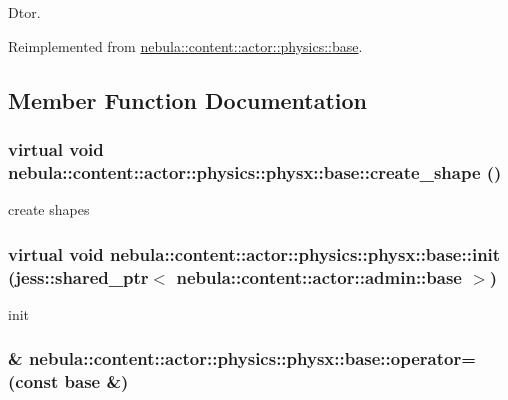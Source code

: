 Dtor. 

Reimplemented from \hyperlink{classnebula_1_1content_1_1actor_1_1physics_1_1base_ac61d7fb5a9b39875b73a4709d20df23e}{nebula::content::actor::physics::base}.

\subsection{Member Function Documentation}
\hypertarget{classnebula_1_1content_1_1actor_1_1physics_1_1physx_1_1base_a1468fd6d256631892912ecec7f236c01}{
\subsubsection[{create\_\-shape}]{\setlength{\rightskip}{0pt plus 5cm}virtual void nebula::content::actor::physics::physx::base::create\_\-shape ()}}
\label{classnebula_1_1content_1_1actor_1_1physics_1_1physx_1_1base_a1468fd6d256631892912ecec7f236c01}


create shapes \hypertarget{classnebula_1_1content_1_1actor_1_1physics_1_1physx_1_1base_a44f695bfb034dae049191b2668a97c70}{
\subsubsection[{init}]{\setlength{\rightskip}{0pt plus 5cm}virtual void nebula::content::actor::physics::physx::base::init (jess::shared\_\-ptr$<$ {\bf nebula::content::actor::admin::base} $>$)}}
\label{classnebula_1_1content_1_1actor_1_1physics_1_1physx_1_1base_a44f695bfb034dae049191b2668a97c70}


init \hypertarget{classnebula_1_1content_1_1actor_1_1physics_1_1physx_1_1base_a0e06604de753b8803bf4364ab967d23d}{
\subsubsection[{operator=}]{\& nebula::content::actor::physics::physx::base::operator= (const {\bf base} \&)}}
\label{classnebula_1_1content_1_1actor_1_1physics_1_1physx_1_1base_a0e06604de753b8803bf4364ab967d23d}


